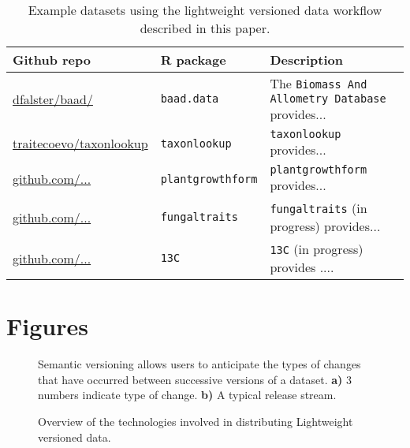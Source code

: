 \documentclass[a4paper,11pt]{article}
\newcommand{\ghsmurl}[1]{{\footnotesize\href{https://github.com/#1}{#1}}}
\begin{document}
\newpage

\begin{table}[h!]
\centering
\caption{Example datasets using the lightweight versioned data workflow described in this paper.}
{\footnotesize
\vspace{1cm}

  \begin{tabular}{p{3.5cm}p{3cm}p{7cm}}
  \hline
   \textbf{Github repo} & \textbf{R package} & \textbf{Description} \\ \hline
  \ghsmurl{dfalster/baad/} & \texttt{baad.data} & The \texttt{Biomass And Allometry Database} \citep{Falster-2015} provides...\\
  \ghsmurl{traitecoevo/taxonlookup} & \texttt{taxonlookup} & \texttt{taxonlookup} \citep{Pennell-2015a} provides...\\
  \ghsmurl{github.com/...} & \texttt{plantgrowthform}  & \texttt{plantgrowthform} provides... \\
  \ghsmurl{github.com/...} & \texttt{fungaltraits} & \texttt{fungaltraits} (in progress) provides... \\
  \ghsmurl{github.com/...} & \texttt{13C} & \texttt{13C} (in progress) provides .... \\
  \hline
  \end{tabular}
  }
\label{tab:examples}
\end{table}

\newpage
\section{Figures}

\begin{figure}[!hb]
\centering
\caption{Semantic versioning allows users to anticipate the types of changes that have occurred between successive versions of a dataset.
\textbf{a)} 3 numbers indicate type of change.
\textbf{b)} A typical release stream.}
\label{fig:semantic}
\end{figure}

\newpage


\begin{figure}[!hb]
\centering
\caption{Overview of the technologies involved in distributing Lightweight versioned data.}
\label{fig:technology_stack}
\end{figure}

\end{document}
